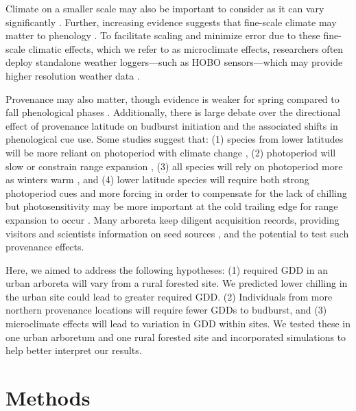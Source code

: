 \documentclass{article}\usepackage[]{graphicx}\usepackage[]{color}
\begin{document}
Climate on a smaller scale may also be important to consider as it can vary significantly \citep[e.g., as much as 2.6$^{\circ}$C between sensors at the same vineyard or up to 6.6$^{\circ}$C within 1 km spatial units in northern Europe,][]{Lenoir2013,deResseguier2020}. Further, increasing evidence suggests that fine-scale climate may matter to phenology \citep{Lembrechts2019}. To facilitate scaling and minimize error due to these fine-scale climatic effects, which we refer to as microclimate effects, researchers often deploy standalone weather loggers---such as HOBO sensors---which may provide higher resolution weather data \citep{Schwartz2013a,Whiteman2000}. %
 
Provenance may also matter, though evidence is weaker for spring compared to fall phenological phases \citep{McKown2013, Aitken2015, Vico2021}. Additionally, there is large debate over the directional effect of provenance latitude on budburst initiation and the associated shifts in phenological cue use. Some studies suggest that: (1) species from lower latitudes will be more reliant on photoperiod with climate change \citep{Zohner2016}, (2) photoperiod will slow or constrain range expansion \citep{Saikkonen2012}, (3) all species will rely on photoperiod more as winters warm \citep{Way2015}, and (4) lower latitude species will require both strong photoperiod cues and more forcing in order to compensate for the lack of chilling but photosensitivity may be more important at the cold trailing edge for range expansion to occur \citep{Gauzere2017}. Many arboreta keep diligent acquisition records, providing visitors and scientists information on seed sources \citep{Dosmann2006}, and the potential to test such provenance effects.

Here, we aimed to address the following hypotheses: (1) required GDD in an urban arboreta will vary from a rural forested site. We predicted lower chilling in the urban site could lead to greater required GDD. (2) Individuals from more northern provenance locations will require fewer GDDs to budburst, and (3) microclimate effects will lead to variation in GDD within sites. We tested these in one urban arboretum and one rural forested site and incorporated simulations to help better interpret our results. 

\section*{Methods}
\end{document}
